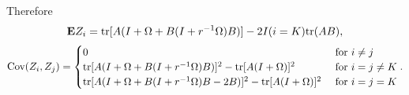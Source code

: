 \documentclass[12pt]{article}
\begin{document}
Therefore
\[
\textbf{E} Z_i = \text{tr}[A (I + \Omega + B(I + r^{-1}\Omega) B)] - 2I(i = K)\text{tr}(AB),
\]
\[
\text{Cov}(Z_i, Z_j) = 
\begin{cases}
0 & \text{ for }i \neq j\\
\text{tr}[A (I + \Omega + B(I + r^{-1}\Omega) B)]^2 - \text{tr}[A(I + \Omega)]^2 & \text{ for }i =j \neq K\\
\text{tr}[A (I + \Omega + B(I + r^{-1}\Omega) B - 2B)]^2 - \text{tr}[A(I + \Omega)]^2 & \text{ for }i=j=K
\end{cases}.
\]
\end{document}
